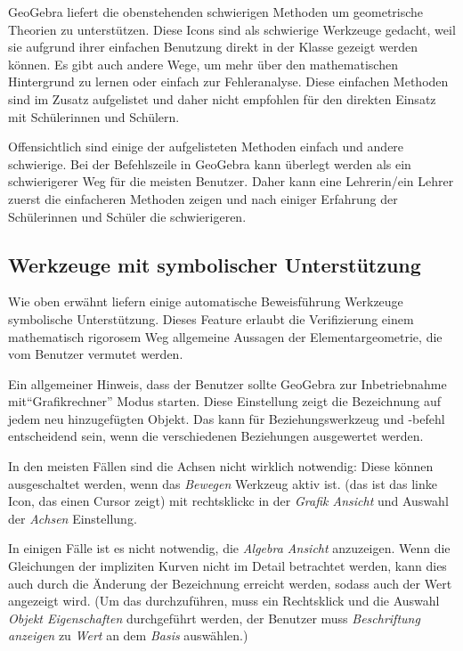 \documentclass{article}
\begin{document}
GeoGebra liefert die obenstehenden schwierigen Methoden um geometrische Theorien zu unterstützen. Diese Icons sind als schwierige Werkzeuge gedacht, weil sie aufgrund ihrer einfachen Benutzung direkt in der Klasse gezeigt werden können. Es gibt auch andere Wege, um mehr über den mathematischen Hintergrund zu lernen oder einfach zur Fehleranalyse. Diese einfachen Methoden sind im Zusatz aufgelistet und daher nicht empfohlen für den direkten Einsatz mit Schülerinnen und Schülern.

Offensichtlich sind einige der aufgelisteten Methoden einfach und andere schwierige. Bei der Befehlszeile in GeoGebra kann überlegt werden als ein schwierigerer Weg für die meisten Benutzer. Daher kann eine Lehrerin/ein Lehrer zuerst die einfacheren Methoden zeigen und nach einiger Erfahrung der Schülerinnen und Schüler die schwierigeren. 

\subsection{Werkzeuge mit symbolischer Unterstützung}

Wie oben erwähnt liefern einige automatische Beweisführung Werkzeuge symbolische Unterstützung. Dieses Feature erlaubt die Verifizierung einem mathematisch rigorosem Weg allgemeine Aussagen der Elementargeometrie, die vom Benutzer vermutet werden.

Ein allgemeiner Hinweis, dass der Benutzer sollte GeoGebra zur Inbetriebnahme mit``Grafikrechner'' Modus starten. Diese Einstellung zeigt die Bezeichnung auf jedem neu hinzugefügten Objekt. Das kann für Beziehungswerkzeug und -befehl entscheidend sein, wenn die verschiedenen Beziehungen ausgewertet werden. 

In den meisten Fällen sind die Achsen nicht wirklich notwendig: Diese können ausgeschaltet werden, wenn das \textit{Bewegen} Werkzeug aktiv ist. (das ist das linke Icon, das einen Cursor zeigt) mit rechtsklickc in der \textit{Grafik Ansicht} und Auswahl der \textit{Achsen} Einstellung.

In einigen Fälle ist es nicht notwendig, die \textit{Algebra Ansicht} anzuzeigen. Wenn die Gleichungen der impliziten Kurven nicht im Detail betrachtet werden,  kann dies auch durch die Änderung der Bezeichnung erreicht werden, sodass auch der Wert angezeigt wird. (Um das durchzuführen, muss ein Rechtsklick und die Auswahl \textit{Objekt Eigenschaften} durchgeführt werden, der Benutzer muss  \textit{Beschriftung anzeigen} zu \textit{Wert} an dem  \textit{Basis} auswählen.)
\end{document}
